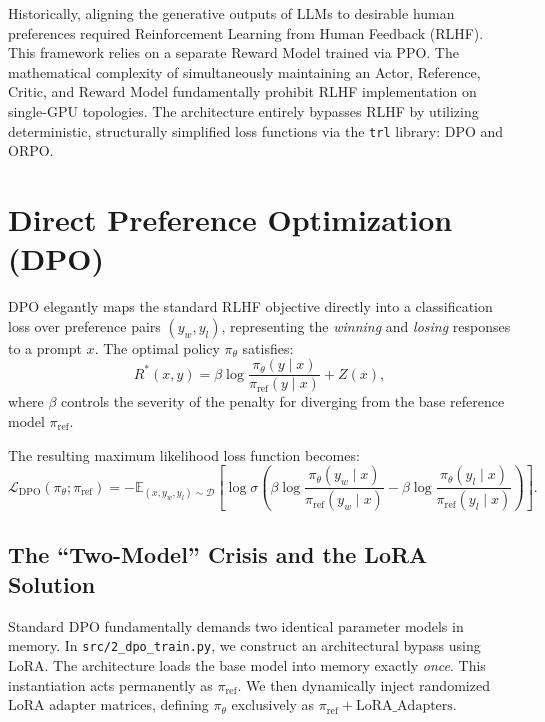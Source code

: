 \documentclass[12pt,a4paper]{report}
\newcommand{\E}{\mathbb{E}}
\newcommand{\Loss}{\mathcal{L}}
\begin{document}
Historically, aligning the generative outputs of LLMs to desirable human preferences required Reinforcement Learning from Human Feedback (RLHF). This framework relies on a separate Reward Model trained via PPO. The mathematical complexity of simultaneously maintaining an Actor, Reference, Critic, and Reward Model fundamentally prohibit RLHF implementation on single-GPU topologies. The architecture entirely bypasses RLHF by utilizing deterministic, structurally simplified loss functions via the \texttt{trl} library: DPO and ORPO.

\section{Direct Preference Optimization (DPO)}

DPO elegantly maps the standard RLHF objective directly into a classification loss over preference pairs $(y_w, y_l)$, representing the \textit{winning} and \textit{losing} responses to a prompt $x$. The optimal policy $\pi_\theta$ satisfies:
\begin{equation}
    R^*(x, y) = \beta \log \frac{\pi_\theta(y \mid x)}{\pi_{\text{ref}}(y \mid x)} + Z(x),
\end{equation}
where $\beta$ controls the severity of the penalty for diverging from the base reference model $\pi_{\text{ref}}$. 

The resulting maximum likelihood loss function \cite{rafailov2023dpo} becomes:
\begin{equation}
    \Loss_{\text{DPO}}(\pi_\theta; \pi_{\text{ref}}) = -\E_{(x, y_w, y_l) \sim \mathcal{D}} \left[ \log \sigma \left( \beta \log \frac{\pi_\theta(y_w \mid x)}{\pi_{\text{ref}}(y_w \mid x)} - \beta \log \frac{\pi_\theta(y_l \mid x)}{\pi_{\text{ref}}(y_l \mid x)} \right) \right].
\end{equation}

\subsection{The ``Two-Model'' Crisis and the LoRA Solution}
Standard DPO fundamentally demands two identical parameter models in memory. In \texttt{src/2_dpo_train.py}, we construct an architectural bypass using LoRA. The architecture loads the base model into memory exactly \textit{once}. This instantiation acts permanently as $\pi_{\text{ref}}$. We then dynamically inject randomized LoRA adapter matrices, defining $\pi_\theta$ exclusively as $\pi_{\text{ref}} + \text{LoRA\_Adapters}$.
\end{document}
